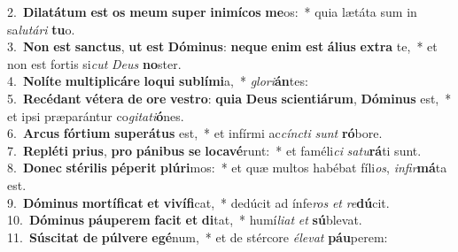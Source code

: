 {2.~}\textbf{Di}\textbf{la}\textbf{tá}\textbf{tum} \textbf{est} \textbf{os} \textbf{me}\textbf{um} \textbf{su}\textbf{per} \textbf{i}\textbf{ni}\textbf{mí}\textbf{cos} \textbf{me}os:~* quia lætáta sum in sa\textit{lu}\textit{tá}\textit{ri} \textbf{tu}o.\\
{3.~}\textbf{Non} \textbf{est} \textbf{san}\textbf{ctus}, \textbf{ut} \textbf{est} \textbf{Dó}\textbf{mi}\textbf{nus}: \textbf{ne}\textbf{que} \textbf{e}\textbf{nim} \textbf{est} \textbf{á}\textbf{li}\textbf{us} \textbf{ex}\textbf{tra} te,~* et non est fortis si\textit{cut} \textit{De}\textit{us} \textbf{no}ster.\\
{4.~}\textbf{No}\textbf{lí}\textbf{te} \textbf{mul}\textbf{ti}\textbf{pli}\textbf{cá}\textbf{re} \textbf{lo}\textbf{qui} \textbf{su}\textbf{blí}\textbf{mi}a,~* \textit{glo}\textit{ri}\textbf{án}tes:\\
{5.~}\textbf{Re}\textbf{cé}\textbf{dant} \textbf{vé}\textbf{te}\textbf{ra} \textbf{de} \textbf{o}\textbf{re} \textbf{ve}\textbf{stro}: \textbf{qui}\textbf{a} \textbf{De}\textbf{us} \textbf{sci}\textbf{en}\textbf{ti}\textbf{á}\textbf{rum}, \textbf{Dó}\textbf{mi}\textbf{nus} est,~* et ipsi præparántur co\textit{gi}\textit{ta}\textit{ti}\textbf{ó}nes.\\
{6.~}\textbf{Ar}\textbf{cus} \textbf{fór}\textbf{ti}\textbf{um} \textbf{su}\textbf{pe}\textbf{rá}\textbf{tus} est,~* et infírmi ac\textit{cín}\textit{cti} \textit{sunt} \textbf{ró}bore.\\
{7.~}\textbf{Re}\textbf{plé}\textbf{ti} \textbf{pri}\textbf{us}, \textbf{pro} \textbf{pá}\textbf{ni}\textbf{bus} \textbf{se} \textbf{lo}\textbf{ca}\textbf{vé}runt:~* et faméli\textit{ci} \textit{sa}\textit{tu}\textbf{rá}ti sunt.\\
{8.~}\textbf{Do}\textbf{nec} \textbf{sté}\textbf{ri}\textbf{lis} \textbf{pé}\textbf{pe}\textbf{rit} \textbf{plú}\textbf{ri}mos:~* et quæ multos habébat fíli\textit{os}, \textit{in}\textit{fir}\textbf{má}ta est.\\
{9.~}\textbf{Dó}\textbf{mi}\textbf{nus} \textbf{mor}\textbf{tí}\textbf{fi}\textbf{cat} \textbf{et} \textbf{vi}\textbf{ví}\textbf{fi}cat,~* dedúcit ad ínfe\textit{ros} \textit{et} \textit{re}\textbf{dú}cit.\\
{10.~}\textbf{Dó}\textbf{mi}\textbf{nus} \textbf{páu}\textbf{pe}\textbf{rem} \textbf{fa}\textbf{cit} \textbf{et} \textbf{di}tat,~* humí\textit{li}\textit{at} \textit{et} \textbf{sú}blevat.\\
{11.~}\textbf{Sú}\textbf{sci}\textbf{tat} \textbf{de} \textbf{púl}\textbf{ve}\textbf{re} \textbf{e}\textbf{gé}num,~* et de stércore \textit{é}\textit{le}\textit{vat} \textbf{páu}perem:\\
